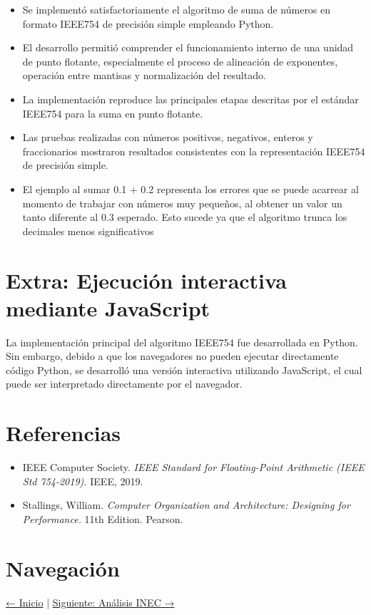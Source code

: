 \documentclass[11pt]{article}
\begin{document}
\begin{itemize}
\item Se implementó satisfactoriamente el algoritmo de suma de números en
formato IEEE754 de precisión simple empleando Python.

\item El desarrollo permitió comprender el funcionamiento interno de una
unidad de punto flotante, especialmente el proceso de alineación de
exponentes, operación entre mantisas y normalización del resultado.

\item La implementación reproduce las principales etapas descritas por el
estándar IEEE754 para la suma en punto flotante.

\item Las pruebas realizadas con números positivos, negativos, enteros y
fraccionarios mostraron resultados consistentes con la representación
IEEE754 de precisión simple.

\item El ejemplo al sumar 0.1 + 0.2 representa los errores que se puede acarrear
al momento de trabajar con números muy pequeños, al obtener un valor un
tanto diferente al 0.3 esperado. Esto sucede ya que el algoritmo trunca los
decimales menos significativos
\end{itemize}
\section{Extra: Ejecución interactiva mediante JavaScript}
\label{sec:org6b629a0}

La implementación principal del algoritmo IEEE754 fue desarrollada en Python.
Sin embargo, debido a que los navegadores no pueden ejecutar directamente
código Python, se desarrolló una versión interactiva utilizando JavaScript,
el cual puede ser interpretado directamente por el navegador.
\section{Referencias}
\label{sec:orgd769abc}

\begin{itemize}
\item IEEE Computer Society. \emph{IEEE Standard for Floating-Point Arithmetic
(IEEE Std 754-2019).} IEEE, 2019.

\item Stallings, William. \emph{Computer Organization and Architecture:
Designing for Performance.} 11th Edition. Pearson.
\end{itemize}
\section{Navegación}
\label{sec:orged40de0}

\href{../index.org}{← Inicio} | \href{../page3-inec.org}{Siguiente: Análisis INEC →}
\end{document}

